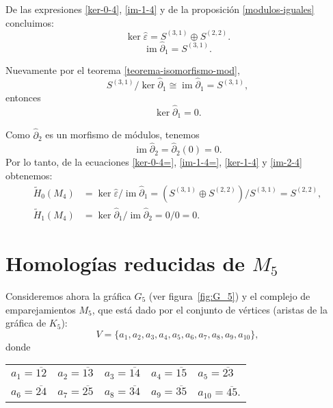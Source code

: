 \documentclass[12pt]{book}
\theoremstyle{definition}
\DeclareMathOperator{\im}{im}
\newcounter{in}
\begin{document}
De las expresiones \ref{ker-0-4}, \ref{im-1-4} y de la
proposición \ref{modulos-iguales} concluimos:
\begin{equation}
  \label{ker-0-4=}
  \ker\widehat\varepsilon=S^{(3,1)}\oplus S^{(2,2)}.
\end{equation}
\begin{equation}
\label{im-1-4=}
\im\widehat\partial_{1}=S^{(3,1)}.
\end{equation}

Nuevamente por el teorema \ref{teorema-isomorfismo-mod},
$$S^{(3,1)}/\ker\widehat\partial_{1}\cong\im\widehat\partial_{1}= S^{(3,1)},$$
entonces
\begin{equation}
  \ker\widehat\partial_{1}=0.
  \label{ker-1-4}
\end{equation}

Como $\widehat\partial_{2}$ es un morfismo de módulos, tenemos
\begin{equation}
  \im\widehat\partial_{2}=\widehat\partial_{2}(0)=0.
  \label{im-2-4}
\end{equation}
Por lo tanto, de la ecuaciones \ref{ker-0-4=}, \ref{im-1-4=},
\ref{ker-1-4} y \ref{im-2-4} obtenemos:
\begin{align*}
\widetilde H_{0}(M_{4})&=\ker \widehat\varepsilon/\im
\widehat\partial_{1}=(S^{(3,1)}\oplus S^{(2,2)})/S^{(3,1)}=S^{(2,2)},\\
\widetilde H_{1}(M_{4})&=\ker \widehat\partial_{1}/\im \widehat\partial_{2}=0/0=0.
\end{align*}

\section{Homologías reducidas de $M_{5}$}
\label{hom-red-M5}

Consideremos ahora la gráfica $G_{5}$ (ver figura~\ref{fig:G_5}) y el complejo de emparejamientos $M_{5}$, que
está dado por el conjunto de vértices (aristas de la gráfica de $K_{5}$):
$$V=\{a_{1},a_{2},a_{3},a_{4},a_{5},a_{6},a_{7},a_{8},a_{9},a_{10}\},$$
donde
\begin{table}[!hbtp]
  \centering
  \begin{tabular}{lllll}
    $a_{1}=\overline{12}$ & $a_{2}=\overline{13}$ & $a_{3}=\overline{14}$ & $a_{4}=\overline{15}$ & $a_{5}=\overline{23}$ \\
    $a_{6}=\overline{24}$ & $a_{7}=\overline{25}$ & $a_{8}=\overline{34}$ & $a_{9}=\overline{35}$ & $a_{10}=\overline{45}$.
  \end{tabular}
\end{table}
\end{document}
